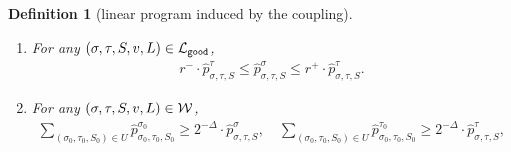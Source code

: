 \documentclass[11pt]{article}
\newtheorem{definition}[theorem]{Definition}
\def\!#1{\mathtt{#1}}
\begin{document}
\begin{definition}[linear program induced by the coupling]
{\begin{enumerate}
\begin{align}
            \end{align}
            and
            \begin{align}\label{eqn-hat-inner-child-sum2}
                \widehat{p}^{\tau}_{\sigma,\tau,S,e}=\widehat{p}^{\tau\land e\gets 0}_{\sigma\land e\gets 0,\tau\land e\gets 0,S\circ e}+\widehat{p}^{\tau\land e\gets 0}_{\sigma\land e\gets 1,\tau\land e\gets 0,S\circ e}, \quad  \widehat{p}^{\tau}_{\sigma,\tau,S,e}=\widehat{p}^{\tau\land e\gets 1}_{\sigma\land e\gets 1,\tau\land e\gets 1,S\circ e}.
            \end{align}
            Otherwise, for each $e\in E_v^{\sigma}$,
            \begin{align}\label{eqn-hat-inner-child-sum3}
                 \widehat{p}^{\sigma}_{\sigma,\tau,S,e}= \widehat{p}^{\sigma \land e\gets 0}_{\sigma\land e\gets 0,\tau\land e\gets 0,S\circ e}+ \widehat{p}^{\sigma\land e\gets 0}_{\sigma\land e\gets 0,\tau\land e\gets 1,S\circ e}, \quad  \widehat{p}^{\sigma}_{\sigma,\tau,S,e}=\widehat{p}^{\sigma\land e\gets 1}_{\sigma\land e\gets 1,\tau\land e\gets 1,S\circ e},
            \end{align}
            and
            \begin{align}\label{eqn-hat-inner-child-sum4}
                 \widehat{p}^{\tau}_{\sigma,\tau,S,e}= \widehat{p}^{\tau\land e\gets 0}_{\sigma\land e\gets 0,\tau\land e\gets 0,S\circ e}, \quad   \widehat{p}^{\tau}_{\sigma,\tau,S,e}= \widehat{p}^{\tau\land e\gets 1}_{\sigma\land e\gets 0,\tau\land e\gets 1,S\circ e} +  \widehat{p}^{\tau \land e\gets 1}_{\sigma\land e\gets 1,\tau\land e\gets 1,S\circ e}.
            \end{align}
        \item For any $(\sigma,\tau,S,v,L)\in \+L_{\!{good}}$,
            \begin{align}\label{eqn-hat-ratio}
                r^-\cdot {\widehat{p}^{\tau}_{\sigma,\tau,S}}\leq {\widehat{p}^{\sigma}_{\sigma,\tau,S}}\leq r^+ \cdot{\widehat{p}^{\tau}_{\sigma,\tau,S}}.
            \end{align}
        \item For any $(\sigma,\tau,S,v,L)\in \mathcal{W} $, 
           \begin{align}\label{eqn-hat-error-bound}
               \sum_{(\sigma_0,\tau_0,S_0)\in U}  \widehat{p}^{\sigma_0}_{\sigma_0,\tau_0,S_0}\geq  2^{-\Delta} \cdot \widehat{p}^{\sigma}_{\sigma,\tau,S}, \quad \sum_{(\sigma_0,\tau_0,S_0)\in U} \widehat{p}^{\tau_0}_{\sigma_0,\tau_0,S_0}\geq  2^{-\Delta} \cdot \widehat{p}^{\tau}_{\sigma,\tau,S},

\end{align}
\end{enumerate}}
\end{definition}
\end{document}
